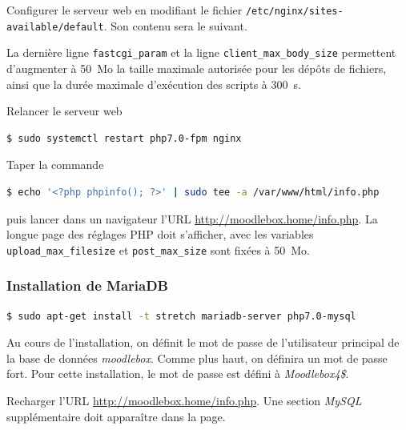 \documentclass[11pt]{article}
\begin{document}
Configurer le serveur web en modifiant le fichier \lstinline{/etc/nginx/sites-available/default}.
Son contenu sera le suivant.



La dernière ligne \lstinline{fastcgi_param} et la ligne \lstinline{client_max_body_size} permettent d'augmenter à 50~Mo la taille maximale autorisée pour les dépôts de fichiers, ainsi que la durée maximale d'exécution des scripts à 300~s.

Relancer le serveur web
\begin{lstlisting}[language=bash]
$ sudo systemctl restart php7.0-fpm nginx
\end{lstlisting}

\begin{verification}
Taper la commande
\begin{lstlisting}[language=bash]
$ echo '<?php phpinfo(); ?>' | sudo tee -a /var/www/html/info.php
\end{lstlisting}
puis lancer dans un navigateur l'URL \url{http://moodlebox.home/info.php}. La longue page des réglages PHP doit s'afficher, avec les variables \lstinline{upload_max_filesize} et \lstinline{post_max_size} sont fixées à 50~Mo.
\end{verification}

\subsubsection{Installation de MariaDB}

\begin{lstlisting}[language=bash]
$ sudo apt-get install -t stretch mariadb-server php7.0-mysql
\end{lstlisting}

Au cours de l'installation, on définit le mot de passe de l'utilisateur principal de la base de données \emph{moodlebox}. Comme plus haut,  on définira un mot de passe fort. Pour cette installation, le mot de passe est défini à \emph{Moodlebox4\$}.

\begin{verification}
Recharger l'URL \url{http://moodlebox.home/info.php}. Une section \emph{MySQL} supplémentaire doit apparaître dans la page.
\end{verification}
\end{document}

